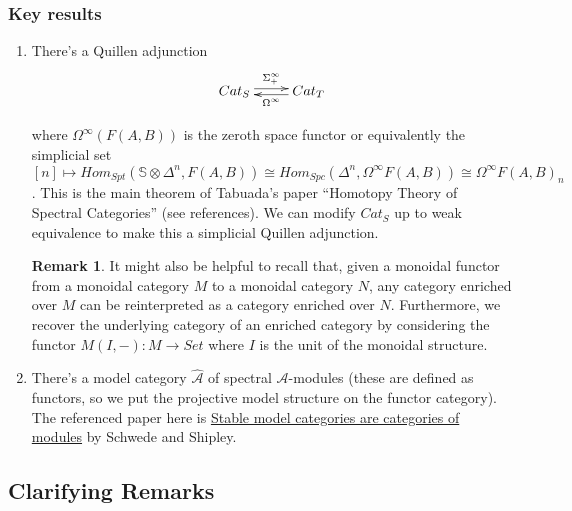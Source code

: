 \documentclass[letterpaper]{article}
\theoremstyle{definition}
\newtheorem{remark}[lemma]{Remark}
\newcommand{\mbb}{\mathbb}
\newcommand{\mc}{\mathcal}
\begin{document}
\subsubsection{Key results}
\begin{enumerate}
\item There's a Quillen adjunction
\[
\xymatrix{Cat_S \ar@<.5ex>[r]^{\Sigma^\infty_+} & \ar@<.5ex>[l]^{\Omega^\infty} Cat_T}
\]

where $\Omega^\infty(F(A,B))$ is the zeroth space functor or
equivalently the simplicial
set $[n] \mapsto Hom_{Spt}(\mbb S \otimes \Delta^n,F(A,B)) \cong
Hom_{Spc}(\Delta^n,\Omega^\infty F(A,B)) \cong \Omega^\infty
F(A,B)_n$. This is the main theorem of Tabuada's paper ``Homotopy
Theory of Spectral Categories'' (see references). We can modify
$Cat_S$ up to weak equivalence to make this a simplicial Quillen
adjunction.

\begin{remark}
It might also be helpful to recall that, given a monoidal functor from
a monoidal category $M$ to a monoidal category $N$, any category
enriched over $M$ can be reinterpreted as a category enriched over
$N$. Furthermore, we recover the underlying category of an enriched
category by considering the functor $M(I,-) : M \rightarrow Set$ where
$I$ is the unit of the monoidal structure.
\end{remark}

\item There's a model category $\widehat{\mc A}$ of spectral $\mc
  A$-modules (these are defined as functors, so we put the projective
  model structure on the functor category). The referenced paper here
  is \href{/References/StabCatAreModuleCat.pdf}{Stable model categories are categories of modules} by Schwede
  and Shipley.
\end{enumerate}

\subsection{Clarifying Remarks}
\end{document}

